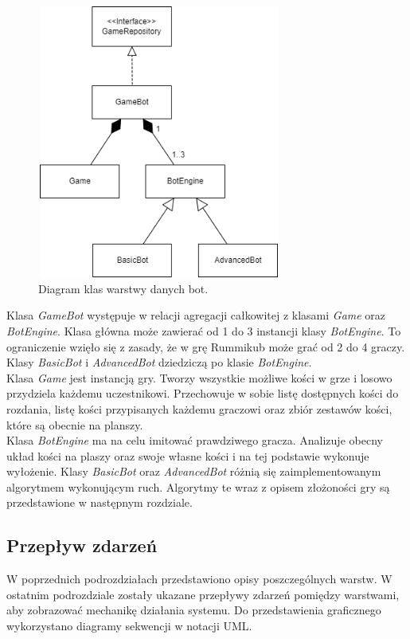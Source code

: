 \begin{figure}[h!]
	\begin{center}
		\includegraphics[width=8cm,height=9cm]{img/bot-client.png}
	\end{center}
	\caption{{\color{dgray}Diagram klas warstwy danych bot.}} 
	\label{bot}
\end{figure}

Klasa \emph{GameBot} występuje w relacji agregacji całkowitej z klasami \emph{Game} oraz \emph{BotEngine}. Klasa główna może zawierać od 1 do 3 instancji klasy \emph{BotEngine}. To ograniczenie wzięło się z zasady, że w grę Rummikub może grać od 2 do 4 graczy. Klasy \emph{BasicBot} i \emph{AdvancedBot} dziedziczą po klasie \emph{BotEngine}. \\
Klasa \emph{Game} jest instancją gry. Tworzy wszystkie możliwe kości w grze i losowo przydziela każdemu uczestnikowi. Przechowuje w sobie listę dostępnych kości do rozdania, listę kości przypisanych każdemu graczowi oraz zbiór zestawów kości, które są obecnie na planszy. \\
Klasa \emph{BotEngine} ma na celu imitować prawdziwego gracza. Analizuje obecny układ kości na plaszy oraz swoje własne kości i na tej podstawie wykonuje wyłożenie. Klasy \emph{BasicBot} oraz \emph{AdvancedBot} różnią się zaimplementowanym algorytmem wykonującym ruch. Algorytmy te wraz z opisem złożoności gry są przedstawione w następnym rozdziale.

\subsection{Przepływ zdarzeń}

W poprzednich podrozdziałach przedstawiono opisy poszczególnych warstw. W ostatnim podrozdziale zostały ukazane przepływy zdarzeń pomiędzy warstwami, aby zobrazować mechanikę działania systemu. Do przedstawienia graficznego wykorzystano diagramy sekwencji w notacji UML.

